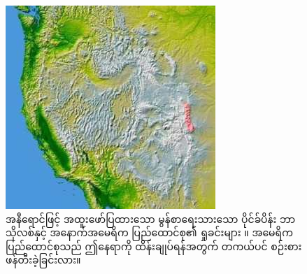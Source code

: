 \documentclass[10pt,twocolumn,letterpaper]{article}
\begin{document}
\begin{flushleft}
\begin{enumerate}
{\begin{figure}[t]
\begin{center}
   \includegraphics[width=1\linewidth]{pike.jpg}
\end{center}
   \caption{အနီရောင်ဖြင့် အထူးဖော်ပြထားသော မွန်စာရေးသားသော ပိုင်ခ်ပိန်း ဘာသိုလစ်နှင့် အနောက်အမေရိက ပြည်ထောင်စု၏ ရှုခင်းများ \cite{36}။ အမေရိက ပြည်ထောင်စုသည် ဤနေရာကို ထိန်းချုပ်ရန်အတွက် တကယ်ပင် စဉ်းစားဖန်တီးခဲ့ခြင်းလား။}
\label{fig:11}
\label{fig:onecol}
\end{figure}

}
\end{enumerate}
\end{flushleft}
\end{document}
